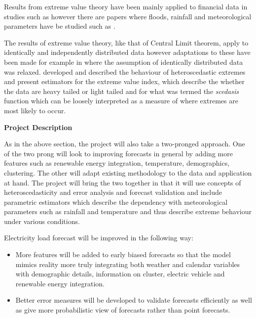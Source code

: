 \documentclass[a4paper]{article}
\begin{document}
Results from extreme value theory have been mainly applied to financial data in studies such as \citet{einmahl16} however there are papers where floods, rainfall and meteorological parameters have be studied such as \citet{ferreira17} .

The results of extreme value theory, like that of Central Limit theorem, apply to identically and independently distributed data however adaptations to these have been made for example in \citet{einmahl16} where the assumption of identically distributed data was relaxed. \citet{einmahl16} developed and described the behaviour of heteroscedastic extremes and present estimators for the extreme value index, which describe the whether the data are heavy tailed or light tailed and for what was termed the \textit{scedasis} function which can be loosely interpreted as a measure of where extremes are most likely to occur. \newline

\noindent \textbf{Project Description}

As in the above section, the project will also take a two-pronged approach. One of the two prong will look to improving forecasts in general by adding more features such as renewable energy integration, temperature, demographics, clustering. The other will adapt existing methodology to the data and application at hand. The project will bring the two together in that it will use concepts of heteroscedasticity and error analysis and forecast validation and include parametric estimators which describe the dependency with meteorological parameters such as rainfall and temperature and thus describe extreme behaviour under various conditions. \newline

\noindent Electricity load forecast will be improved in the following way:
\begin{itemize}
\item More features will be added to early biased forecasts so that the model mimics reality more truly integrating both weather and calendar variables with demographic details, information on cluster, electric vehicle and renewable energy integration.
\item Better error measures will be developed to validate forecasts efficiently as well as give more probabilistic view of forecasts rather than point forecasts.
\end{itemize}
\end{document}
